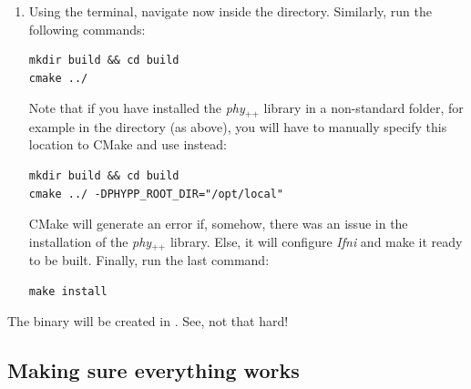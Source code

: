 \documentclass[12pt,a4paper]{article}
\newcommand{\phypp}{\textit{phy}$_{\text{++}}$\xspace}
\newcommand{\ifni}{\textit{Ifni}\xspace}
\begin{document}
\begin{enumerate}
Here, the ``...'' have to be replaced by the directory in which you want to install the library. For example, if you want to install it in , just replace ``...'' by . This will install the library headers in . This can of course be combined with the manual installation directories for WCSlib and cfitsio.

If all goes well, this will configure the \phypp library and prepare it for installation. The script will most likely warn you about missing dependencies, but this is ok since none of these are needed for \ifni. Just make sure that cfitsio and WCSlib are found correctly, then install the library with the following command:

\begin{verbatim}
sudo make install
# or just 'make install' if you do not have root access
source ~/.phypprc
\end{verbatim}

\item Using the terminal, navigate now inside the  directory. Similarly, run the following commands:
\begin{verbatim}
mkdir build && cd build
cmake ../
\end{verbatim}

Note that if you have installed the \phypp library in a non-standard folder, for example in the  directory (as above), you will have to manually specify this location to CMake and use instead:
\begin{verbatim}
mkdir build && cd build
cmake ../ -DPHYPP_ROOT_DIR="/opt/local"
\end{verbatim}

CMake will generate an error if, somehow, there was an issue in the installation of the \phypp library. Else, it will configure \ifni and make it ready to be built. Finally, run the last command:
\begin{verbatim}
make install
\end{verbatim}
\end{enumerate}

The  binary will be created in . See, not that hard!

\subsection{Making sure everything works}
\end{document}

